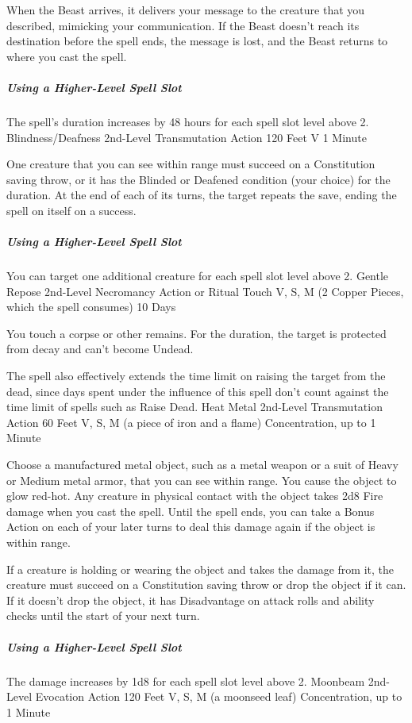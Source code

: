 \documentclass[letterpaper,openany,oneside,twocolumn]{book}
\begin{document}
When the Beast arrives, it delivers your message to the creature that you described, mimicking your communication. If the Beast doesn't reach its destination before the spell ends, the message is lost, and the Beast returns to where you cast the spell.

\subparagraph*{Using a Higher-Level Spell Slot} The spell's duration increases by 48 hours for each spell slot level above 2.
\DndSpellHeader
  {Blindness/Deafness}
  {2nd-Level Transmutation}
  {Action}
  {120 Feet}
  {V}
  {1 Minute}

One creature that you can see within range must succeed on a Constitution saving throw, or it has the Blinded or Deafened condition (your choice) for the duration. At the end of each of its turns, the target repeats the save, ending the spell on itself on a success.

\subparagraph*{Using a Higher-Level Spell Slot} You can target one additional creature for each spell slot level above 2.
\DndSpellHeader
  {Gentle Repose}
  {2nd-Level Necromancy}
  {Action or Ritual}
  {Touch}
  {V, S, M (2 Copper Pieces, which the spell consumes)}
  {10 Days}

You touch a corpse or other remains. For the duration, the target is protected from decay and can't become Undead.

The spell also effectively extends the time limit on raising the target from the dead, since days spent under the influence of this spell don't count against the time limit of spells such as Raise Dead.
\DndSpellHeader
  {Heat Metal}
  {2nd-Level Transmutation}
  {Action}
  {60 Feet}
  {V, S, M (a piece of iron and a flame)}
  {Concentration, up to 1 Minute}

Choose a manufactured metal object, such as a metal weapon or a suit of Heavy or Medium metal armor, that you can see within range. You cause the object to glow red-hot. Any creature in physical contact with the object takes 2d8 Fire damage when you cast the spell. Until the spell ends, you can take a Bonus Action on each of your later turns to deal this damage again if the object is within range.

If a creature is holding or wearing the object and takes the damage from it, the creature must succeed on a Constitution saving throw or drop the object if it can. If it doesn't drop the object, it has Disadvantage on attack rolls and ability checks until the start of your next turn.

\subparagraph*{Using a Higher-Level Spell Slot} The damage increases by 1d8 for each spell slot level above 2.
\DndSpellHeader
  {Moonbeam}
  {2nd-Level Evocation}
  {Action}
  {120 Feet}
  {V, S, M (a moonseed leaf)}
  {Concentration, up to 1 Minute}
\end{document}
